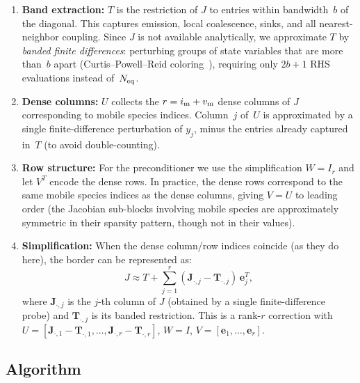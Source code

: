 \documentclass[11pt]{article}
\newcommand{\Neq}{N_{\rm eq}}
\newcommand{\im}{i_{\rm m}}
\newcommand{\vm}{v_{\rm m}}
\newcommand{\bw}{b}
\newcommand{\rank}{r}
\begin{document}
\begin{enumerate}
  \item \textbf{Band extraction:} $T$ is the restriction of $J$ to
    entries within bandwidth~$\bw$ of the diagonal. This captures
    emission, local coalescence, sinks, and all
    nearest-neighbor coupling. Since $J$ is not available
    analytically, we approximate $T$ by \emph{banded finite
    differences}: perturbing groups of state variables that are
    more than~$\bw$ apart (Curtis--Powell--Reid
    coloring~\cite{CurtisPowellReid1974}), requiring only
    $2\bw + 1$ RHS evaluations instead of~$\Neq$.

  \item \textbf{Dense columns:} $U$ collects the $\rank = \im + \vm$
    dense columns of $J$ corresponding to mobile species indices.
    Column~$j$ of~$U$ is approximated by a single finite-difference
    perturbation of $y_{j}$, minus the entries already captured
    in~$T$ (to avoid double-counting).

  \item \textbf{Row structure:} For the preconditioner we use the
    simplification $W = I_{\rank}$ and let $V^{T}$ encode the dense
    rows. In practice, the dense rows correspond to the same mobile
    species indices as the dense columns, giving $V = U$ to leading
    order (the Jacobian sub-blocks involving mobile species are
    approximately symmetric in their sparsity pattern, though not in
    their values).

  \item \textbf{Simplification:} When the dense column/row indices
    coincide (as they do here), the border can be represented as:
    \begin{equation}
      J \approx T + \sum_{j=1}^{\rank}
      (\mathbf{J}_{\cdot,j} - \mathbf{T}_{\cdot,j})\,\mathbf{e}_{j}^{T},
    \end{equation}
    where $\mathbf{J}_{\cdot,j}$ is the $j$-th column of $J$
    (obtained by a single finite-difference probe) and
    $\mathbf{T}_{\cdot,j}$ is its banded restriction. This is a
    rank-$\rank$ correction with
    $U = [\mathbf{J}_{\cdot,1} - \mathbf{T}_{\cdot,1},\ldots,
    \mathbf{J}_{\cdot,\rank} - \mathbf{T}_{\cdot,\rank}]$,
    $W = I$, $V = [\mathbf{e}_{1},\ldots,\mathbf{e}_{\rank}]$.
\end{enumerate}

\subsection{Algorithm}
\end{document}
